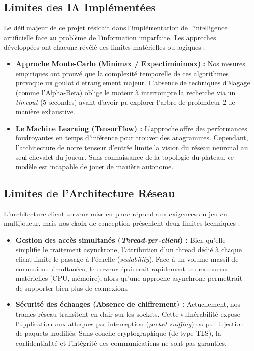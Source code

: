 \documentclass[a4paper]{article}
\begin{document}
	\subsection{Limites des IA Implémentées}
	Le défi majeur de ce projet résidait dans l'implémentation de l'intelligence artificielle face au problème de l'information imparfaite. Les approches développées ont chacune révélé des limites matérielles ou logiques :
	\begin{itemize}
		\item \textbf{Approche Monte-Carlo (Minimax / Expectiminimax) :} Nos mesures empiriques ont prouvé que la complexité temporelle de ces algorithmes provoque un goulot d'étranglement majeur. L'absence de techniques d'élagage (comme l'Alpha-Beta) oblige le moteur à interrompre la recherche via un \textit{timeout} (5 secondes) avant d'avoir pu explorer l'arbre de profondeur 2 de manière exhaustive.
		\item \textbf{Le Machine Learning (TensorFlow) :} L'approche offre des performances foudroyantes en temps d'inférence pour trouver des anagrammes. Cependant, l'architecture de notre tenseur d'entrée limite la vision du réseau neuronal au seul chevalet du joueur. Sans connaissance de la topologie du plateau, ce modèle est incapable de jouer de manière autonome.
	\end{itemize}

    \subsection{Limites de l'Architecture Réseau}
    L'architecture client-serveur mise en place répond aux exigences du jeu en multijoueur, mais nos choix de conception présentent deux limites techniques :
    \begin{itemize}
        \item \textbf{Gestion des accès simultanés (\textit{Thread-per-client}) :} Bien qu'elle simplifie le traitement asynchrone, l'attribution d'un thread dédié à chaque client limite le passage à l'échelle (\textit{scalability}). Face à un volume massif de connexions simultanées, le serveur épuiserait rapidement ses ressources matérielles (CPU, mémoire), alors qu’une approche asynchrone permettrait de supporter bien plus de connexions.
        \item \textbf{Sécurité des échanges (Absence de chiffrement) :} Actuellement, nos trames réseau transitent en clair sur les sockets. Cette vulnérabilité expose l'application aux attaques par interception (\textit{packet sniffing}) ou par injection de paquets modifiés. Sans couche cryptographique (de type TLS), la confidentialité et l'intégrité des communications ne sont pas garanties.
    \end{itemize}
\end{document}
